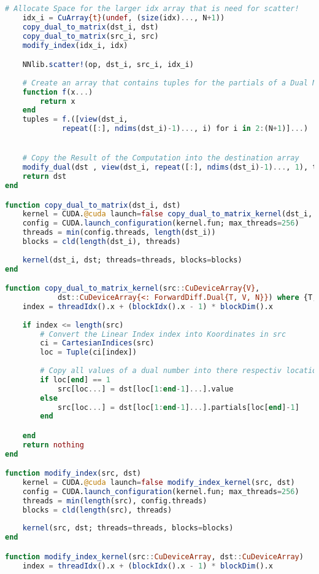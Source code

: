 \begin{lstlisting}[language=Julia]
    # Allocate Space for the larger idx array that is need for scatter!
    idx_i = CuArray{t}(undef, (size(idx)..., N+1))
    copy_dual_to_matrix(dst_i, dst)
    copy_dual_to_matrix(src_i, src)
    modify_index(idx_i, idx)

    NNlib.scatter!(op, dst_i, src_i, idx_i) 
    
    # Create an array that contains tuples for the partials of a Dual Number
    function f(x...)
        return x
    end
    tuples = f.([view(dst_i, 
             repeat([:], ndims(dst_i)-1)..., i) for i in 2:(N+1)]...)


    # Copy the Result of the Computation into the destination array
    modify_dual(dst , view(dst_i, repeat([:], ndims(dst_i)-1)..., 1), tuples)
    return dst
end

function copy_dual_to_matrix(dst_i, dst)
    kernel = CUDA.@cuda launch=false copy_dual_to_matrix_kernel(dst_i, dst)
    config = CUDA.launch_configuration(kernel.fun; max_threads=256)
    threads = min(config.threads, length(dst_i))
    blocks = cld(length(dst_i), threads)
    
    kernel(dst_i, dst; threads=threads, blocks=blocks)
end

function copy_dual_to_matrix_kernel(src::CuDeviceArray{V}, 
            dst::CuDeviceArray{<: ForwardDiff.Dual{T, V, N}}) where {T, V, N}
    index = threadIdx().x + (blockIdx().x - 1) * blockDim().x
   
    if index <= length(src) 
        # Convert the Linear Index index into Koordinates in src
        ci = CartesianIndices(src)
        loc = Tuple(ci[index])
        
        # Copy all values of a dual number into there respectiv location
        if loc[end] == 1
            src[loc...] = dst[loc[1:end-1]...].value 
        else 
            src[loc...] = dst[loc[1:end-1]...].partials[loc[end]-1]
        end

    end
    return nothing
end

function modify_index(src, dst)
    kernel = CUDA.@cuda launch=false modify_index_kernel(src, dst) 
    config = CUDA.launch_configuration(kernel.fun; max_threads=256)
    threads = min(length(src), config.threads)
    blocks = cld(length(src), threads)
    
    kernel(src, dst; threads=threads, blocks=blocks)
end

function modify_index_kernel(src::CuDeviceArray, dst::CuDeviceArray)
    index = threadIdx().x + (blockIdx().x - 1) * blockDim().x
    

\end{lstlisting}
